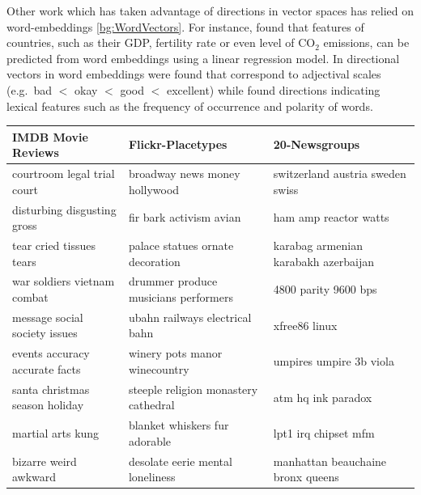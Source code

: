 Other work which has taken advantage of directions in vector spaces has relied on word-embeddings \ref{bg:WordVectors}. For instance,  \cite{gupta2015distributional} found that features of countries, such as their GDP, fertility rate or even level of CO$_2$ emissions, can be predicted from word embeddings using a linear regression model.   In \cite{kim2013deriving} directional vectors in word embeddings were found that correspond to adjectival scales (e.g.\ bad $<$ okay $<$ good $<$ excellent) while \cite{Rothe2016} found directions indicating lexical features such as the frequency of occurrence and polarity of words.



\begin{table}[] 
	\scriptsize
	\begin{tabular}{lll}                                                                   
		\textbf{IMDB Movie Reviews}                                 & \textbf{Flickr-Placetypes}           & \textbf{20-Newsgroups}                           \\
		\toprule
		courtroom legal trial court                                 & broadway news money hollywood        & switzerland austria sweden swiss     \\
		disturbing disgusting gross                                 & fir bark activism avian              & ham amp reactor watts                \\
		tear cried tissues tears                                    & palace statues ornate decoration     & karabag armenian karabakh azerbaijan \\
		war soldiers vietnam combat                                 & drummer produce musicians performers & 4800 parity 9600 bps                 \\
		message social society issues                               & ubahn railways electrical bahn       & xfree86 linux                        \\
		events accuracy accurate facts                              & winery pots manor winecountry        & umpires umpire 3b viola              \\
		santa christmas season holiday                              & steeple religion monastery cathedral & atm hq ink paradox                   \\
		martial arts kung                                           & blanket whiskers fur adorable        & lpt1 irq chipset mfm                 \\
		bizarre weird awkward                                       & desolate eerie mental loneliness     & manhattan beauchaine bronx queens    \\

\end{tabular}
\end{table}
